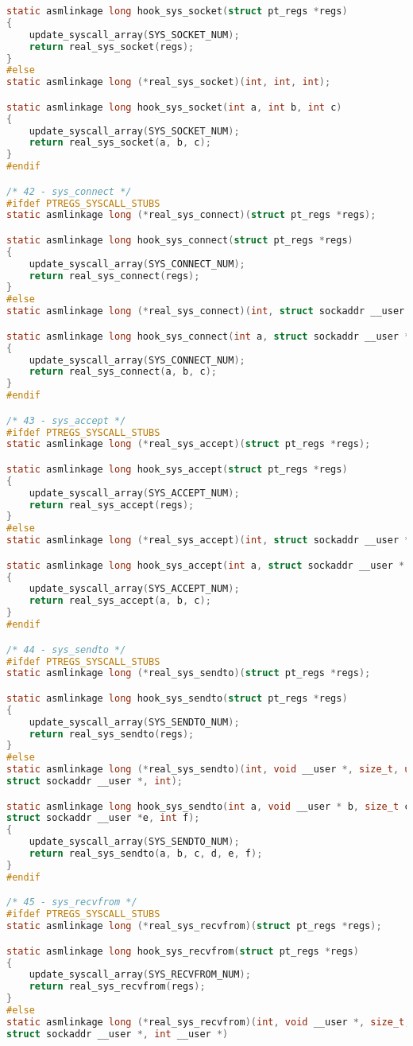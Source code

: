 \begin{lstlisting}[label=lst:log, caption=Листинг файла hooks.c, language=c]
static asmlinkage long hook_sys_socket(struct pt_regs *regs)
{
	update_syscall_array(SYS_SOCKET_NUM);
	return real_sys_socket(regs);
}
#else
static asmlinkage long (*real_sys_socket)(int, int, int);

static asmlinkage long hook_sys_socket(int a, int b, int c)
{
	update_syscall_array(SYS_SOCKET_NUM);
	return real_sys_socket(a, b, c);
}
#endif

/* 42 - sys_connect */
#ifdef PTREGS_SYSCALL_STUBS
static asmlinkage long (*real_sys_connect)(struct pt_regs *regs);

static asmlinkage long hook_sys_connect(struct pt_regs *regs)
{
	update_syscall_array(SYS_CONNECT_NUM);
	return real_sys_connect(regs);
}
#else
static asmlinkage long (*real_sys_connect)(int, struct sockaddr __user *, int);

static asmlinkage long hook_sys_connect(int a, struct sockaddr __user * b, int c);
{
	update_syscall_array(SYS_CONNECT_NUM);
	return real_sys_connect(a, b, c);
}
#endif

/* 43 - sys_accept */
#ifdef PTREGS_SYSCALL_STUBS
static asmlinkage long (*real_sys_accept)(struct pt_regs *regs);

static asmlinkage long hook_sys_accept(struct pt_regs *regs)
{
	update_syscall_array(SYS_ACCEPT_NUM);
	return real_sys_accept(regs);
}
#else
static asmlinkage long (*real_sys_accept)(int, struct sockaddr __user *, int __user *)

static asmlinkage long hook_sys_accept(int a, struct sockaddr __user * b, int __user *c)
{
	update_syscall_array(SYS_ACCEPT_NUM);
	return real_sys_accept(a, b, c);
}
#endif

/* 44 - sys_sendto */
#ifdef PTREGS_SYSCALL_STUBS
static asmlinkage long (*real_sys_sendto)(struct pt_regs *regs);

static asmlinkage long hook_sys_sendto(struct pt_regs *regs)
{
	update_syscall_array(SYS_SENDTO_NUM);
	return real_sys_sendto(regs);
}
#else
static asmlinkage long (*real_sys_sendto)(int, void __user *, size_t, unsigned,
struct sockaddr __user *, int);

static asmlinkage long hook_sys_sendto(int a, void __user * b, size_t c, unsigned d,
struct sockaddr __user *e, int f);
{
	update_syscall_array(SYS_SENDTO_NUM);
	return real_sys_sendto(a, b, c, d, e, f);
}
#endif

/* 45 - sys_recvfrom */
#ifdef PTREGS_SYSCALL_STUBS
static asmlinkage long (*real_sys_recvfrom)(struct pt_regs *regs);

static asmlinkage long hook_sys_recvfrom(struct pt_regs *regs)
{
	update_syscall_array(SYS_RECVFROM_NUM);
	return real_sys_recvfrom(regs);
}
#else
static asmlinkage long (*real_sys_recvfrom)(int, void __user *, size_t, unsigned,
struct sockaddr __user *, int __user *)


\end{lstlisting}
